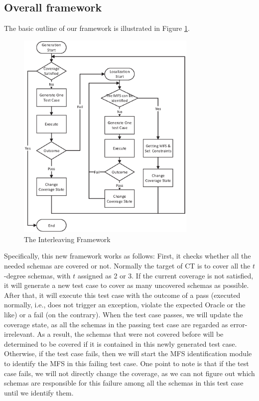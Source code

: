 \documentclass[journal,12pt,onecolumn,draftclsnofoot,]{IEEEtran}
\begin{document}
\subsection{Overall framework}\label{sec:app:frame}
 The basic outline of our framework is illustrated in Figure \ref{new-life}.
\begin{figure}
 \includegraphics[width=3.4in]{baicOutline.eps}
\caption{The Interleaving Framework}
\label{new-life}
\end{figure}
Specifically, this new framework works as follows: First, it checks whether all the needed schemas are covered or not. Normally the target of CT is to cover all the $t$-degree schemas, with $t$ assigned as 2 or 3. If the current coverage is not satisfied, it will generate a new test case to cover as many uncovered schemas as possible. After that, it will execute this test case with the outcome of a pass (executed normally, i.e., does not trigger an exception, violate the expected Oracle  or the like) or a fail (on the contrary). When the test case passes, we will update the coverage state, as all the schemas in the passing test case are regarded as error-irrelevant. As a result, the schemas that were not covered before will be determined to be covered if it is contained in this newly generated test case. Otherwise, if the test case fails, then we will start the MFS identification module to identify the MFS in this failing test case. One point to note is that if the test case fails, we will not directly change the coverage, as we can not figure out which schemas are responsible for this failure among all the schemas in this test case until we identify them.
\end{document}
